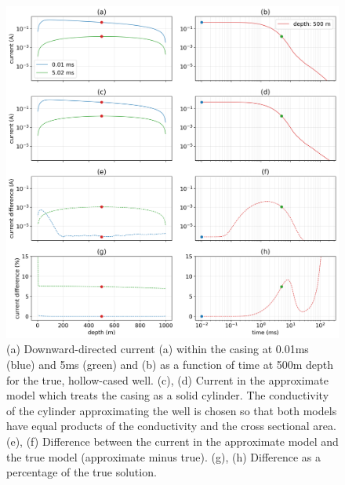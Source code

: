 \begin{figure}
    \begin{center}
    \includegraphics[width=\textwidth]{figures/em_casing/approx_casing_currents.png}
    \end{center}
\caption{
    (a) Downward-directed current (a) within the casing at 0.01ms (blue) and 5ms (green)
    and (b) as a function of time at 500m depth for the true, hollow-cased well.
    (c), (d) Current in the approximate model which treats the casing as a solid cylinder.
     The conductivity of the cylinder approximating the well is chosen so that both models have
    equal products of the conductivity and the cross sectional area.
    (e), (f) Difference between the current in the approximate model and the true model (approximate minus true).
    (g), (h) Difference as a percentage of the true solution.
}
\label{fig:approx_casing_currents}
\end{figure}



